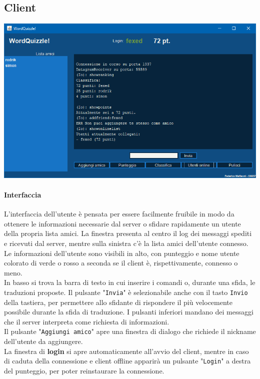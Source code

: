 \documentclass[10pt]{article}
\begin{document}
{\subsection{Client}
\begin{center}
\includegraphics[scale=0.75]{client.png}
\end{center}
\paragraph{Interfaccia} L'interfaccia dell'utente è pensata per essere facilmente fruibile in modo da ottenere le informazioni necessarie dal server o sfidare rapidamente un utente della propria lista amici. La finestra presenta al centro il log dei messaggi spediti e ricevuti dal server, mentre sulla sinistra c'è la lista amici dell'utente connesso. Le informazioni dell'utente sono visibili in alto, con punteggio e nome utente colorato di verde o rosso a seconda se il client è, rispettivamente, connesso o meno.\\
In basso si trova la barra di testo in cui inserire i comandi o, durante una sfida, le traduzioni proposte. Il pulsante "\texttt{Invia}" è selezionabile anche con il tasto \texttt{Invio} della tastiera, per permettere allo sfidante di rispondere il più velocemente possibile durante la sfida di traduzione. I pulsanti inferiori mandano dei messaggi che il server interpreta come richiesta di informazioni.\\
Il pulsante "\texttt{Aggiungi amico}" apre una finestra di dialogo che richiede il nickname dell'utente da aggiungere.\\
La finestra di \textbf{login} si apre automaticamente all'avvio del client, mentre in caso di caduta della connessione e client offline apparirà un pulsante "\texttt{Login}" a destra del punteggio, per poter reinstaurare la connessione.
}
\end{document}
